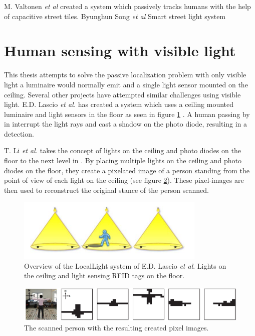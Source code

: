 M. Valtonen \textit{et al} created a system which passively tracks humans with the help of capacitive street tiles\cite{Tile_Track}. 
Byunghun Song \textit{et al}\cite{PIR_Tracking}
Smart street light system \cite{tvilight}


\section{Human sensing with visible light}
\label{sec:Visible light communication}
This thesis attempts to solve the passive localization problem with only visible light a luminaire would normally emit and a single light sensor mounted on the ceiling. Several other projects have attempted similar challenges using visible light. E.D. Lascio \textit{et al.} has created a system which uses a ceiling mounted luminaire and light sensors in the floor as seen in figure \ref{fig:LocalLight} \cite{LocaLight}. A human passing by in interrupt the light rays and cast a shadow on the photo diode, resulting in a detection.

T. Li \textit{et al.} takes the concept of lights on the ceiling and photo diodes on the floor to the next level in \cite{Human_Sensing_Using_VLC}. By placing multiple lights on the ceiling and photo diodes on the floor, they create a pixelated image of a person standing from the point of view of each light on the ceiling (see figure \ref{fig:humansensingwithvisiblelight}). These pixel-images are then used to reconstruct the original stance of the person scanned.

\begin{figure}[]
	\centering
	\label{fig:LocalLight}
	\includegraphics[width=90mm]{pics/LocalLight.png}
	\caption{Overview of the LocalLight system of E.D. Lascio \textit{et al}. Lights on the ceiling and light sensing RFID tags on the floor.}
\end{figure}

\begin{figure}[]
	\centering
	\label{fig:humansensingwithvisiblelight}
	\includegraphics[width=\textwidth]{pics/humansensingwithvisiblelight.png}
	\caption{The scanned person with the resulting created pixel images.}
\end{figure}

